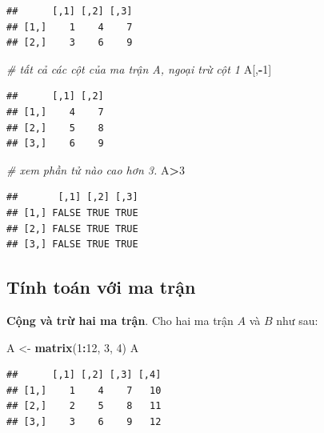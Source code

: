 \documentclass[
]{book}
\newenvironment{Shaded}{\begin{snugshade}}{\end{snugshade}}
\newcommand{\CommentTok}[1]{\textcolor[rgb]{0.56,0.35,0.01}{\textit{#1}}}
\newcommand{\DecValTok}[1]{\textcolor[rgb]{0.00,0.00,0.81}{#1}}
\newcommand{\KeywordTok}[1]{\textcolor[rgb]{0.13,0.29,0.53}{\textbf{#1}}}
\newcommand{\NormalTok}[1]{#1}
\newcommand{\OperatorTok}[1]{\textcolor[rgb]{0.81,0.36,0.00}{\textbf{#1}}}
\newcommand{\StringTok}[1]{\textcolor[rgb]{0.31,0.60,0.02}{#1}}
\begin{document}
\begin{verbatim}
##      [,1] [,2] [,3]
## [1,]    1    4    7
## [2,]    3    6    9
\end{verbatim}

\begin{Shaded}
\begin{Highlighting}[]
\CommentTok{\# tất cả các cột của ma trận A, ngoại trừ cột 1}
\NormalTok{A[,}\OperatorTok{{-}}\DecValTok{1}\NormalTok{]}
\end{Highlighting}
\end{Shaded}

\begin{verbatim}
##      [,1] [,2]
## [1,]    4    7
## [2,]    5    8
## [3,]    6    9
\end{verbatim}

\begin{Shaded}
\begin{Highlighting}[]
\CommentTok{\# xem phần tử nào cao hơn 3.}
\NormalTok{A}\OperatorTok{\textgreater{}}\DecValTok{3}
\end{Highlighting}
\end{Shaded}

\begin{verbatim}
##       [,1] [,2] [,3]
## [1,] FALSE TRUE TRUE
## [2,] FALSE TRUE TRUE
## [3,] FALSE TRUE TRUE
\end{verbatim}

\hypertarget{tuxednh-touxe1n-vux1edbi-ma-trux1eadn}{%
\subsection{Tính toán với ma trận}\label{tuxednh-touxe1n-vux1edbi-ma-trux1eadn}}

\textbf{Cộng và trừ hai ma trận}. Cho hai ma trận \(A\) và \(B\) như sau:

\begin{Shaded}
\begin{Highlighting}[]
\NormalTok{A \textless{}{-}}\StringTok{ }\KeywordTok{matrix}\NormalTok{(}\DecValTok{1}\OperatorTok{:}\DecValTok{12}\NormalTok{, }\DecValTok{3}\NormalTok{, }\DecValTok{4}\NormalTok{)}
\NormalTok{A}
\end{Highlighting}
\end{Shaded}

\begin{verbatim}
##      [,1] [,2] [,3] [,4]
## [1,]    1    4    7   10
## [2,]    2    5    8   11
## [3,]    3    6    9   12
\end{verbatim}
\end{document}

